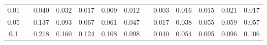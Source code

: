 % 
\begin{tabular}{ccccccccccccc}
  \hline
  \hline
0.01 &  & 0.040 & 0.032 & 0.017 & 0.009 & 0.012 &  & 0.003 & 0.016 & 0.015 & 0.021 & 0.017 \\ 
  0.05 &  & 0.137 & 0.093 & 0.067 & 0.061 & 0.047 &  & 0.017 & 0.038 & 0.055 & 0.059 & 0.057 \\ 
  0.1 &  & 0.218 & 0.160 & 0.124 & 0.108 & 0.098 &  & 0.040 & 0.054 & 0.095 & 0.096 & 0.106 \\ 
   \hline
\end{tabular}
